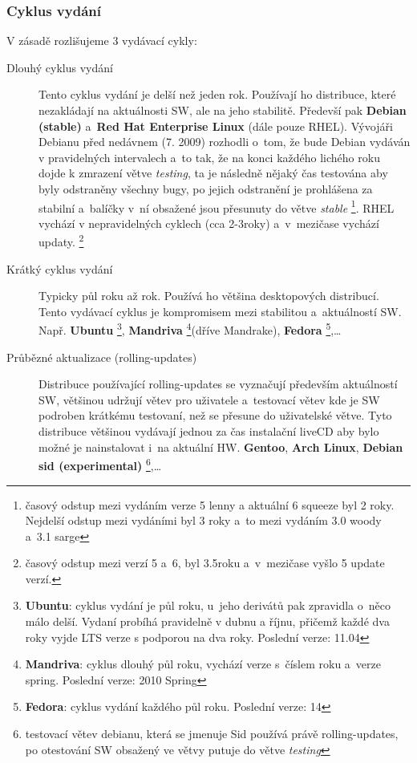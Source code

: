 \documentclass[a4paper,12pt]{article}
\renewcommand{\b}[1]{\textbf{#1}} %
\renewcommand{\it}[1]{\textit{#1}}		%
\begin{document}
\subsubsection{Cyklus vydání}
V zásadě rozlišujeme 3 vydávací cykly:
\begin{description}
 \item[Dlouhý cyklus vydání] Tento cyklus vydání je delší než jeden rok. Používají ho distribuce, které nezakládají na aktuálnosti SW, ale na jeho stabilitě. Předevší pak \b{Debian (stable)} a~\b{Red Hat Enterprise Linux} (dále pouze RHEL). Vývojáři Debianu před nedávnem (7. 2009) rozhodli o~tom, že bude Debian vydáván v pravidelných intervalech a~to tak, že na konci každého lichého roku dojde k zmrazení větve \it{testing}, ta je následně nějaký čas testována aby byly odstraněny všechny bugy, po jejich odstranění je prohlášena za stabilní a~balíčky v~ní obsažené jsou přesunuty do větve \it{stable}
\footnote{časový odstup mezi vydáním verze 5 lenny a aktuální 6 squeeze byl 2 roky. Nejdelší odstup mezi vydáními byl 3 roky a~to mezi vydáním 3.0 woody a~3.1 sarge}. RHEL vychází v nepravidelných cyklech (cca 2-3roky) a~v~mezičase vychází updaty. 
\footnote{časový odstup mezi verzí 5 a~6, byl 3.5roku a~v~mezičase vyšlo 5 update verzí.}
 \item[Krátký cyklus vydání] Typicky půl roku až rok. Používá ho většina desktopových distribucí. Tento vydávací cyklus je kompromisem mezi stabilitou a~aktuálností SW. Např. \b{Ubuntu}
\footnote{\b{Ubuntu}: cyklus vydání je půl roku, u~jeho derivátů pak zpravidla o~něco málo delší. Vydaní probíhá pravidelně v dubnu a říjnu, přičemž každé dva roky vyjde LTS verze s podporou na dva roky. Poslední verze: 11.04}, \b{Mandriva} 
\footnote{\b{Mandriva}: cyklus dlouhý půl roku, vychází verze s~číslem roku a~verze spring. Poslední verze: 2010 Spring}(dříve Mandrake), \b{Fedora} 
\footnote{\b{Fedora}: cyklus vydání každého půl roku. Poslední verze: 14},…
 \item[Průbězné aktualizace (rolling-updates)] Distribuce používající rolling-updates se vyznačují především aktuálností SW, většinou udržují větev pro uživatele a~testovací větev kde je SW podroben krátkému testovaní, než se přesune do uživatelské větve. Tyto distribuce většinou vydávají jednou za čas instalační liveCD aby bylo možné je nainstalovat i~na aktuální HW. \b{Gentoo}, \b{Arch Linux}, \b{Debian sid (experimental)}
\footnote{testovací větev debianu, která se jmenuje Sid používá právě rolling-updates, po otestování SW obsažený ve větvy putuje do větve \it{testing}},…
 \end{description}
\end{document}
